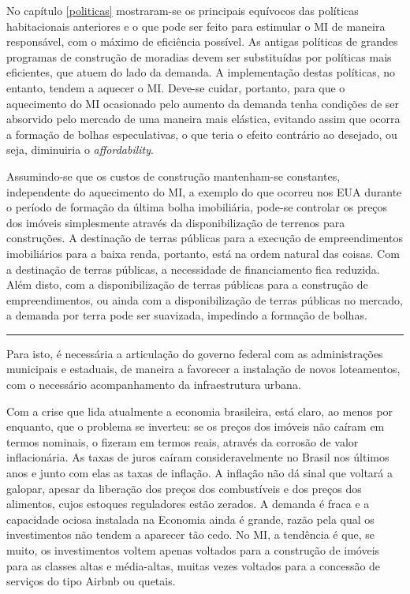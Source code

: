 \documentclass[
	12pt,				%
	oneside,			%
	a4paper,			%
	chapter=TITLE,		%
	section=TITLE,		%
	english,			%
	brazil				%
	]{abntex2}
\begin{document}
\begin{refsection}
No capítulo \ref{politicas} mostraram-se os principais equívocos das políticas
habitacionais anteriores e o que pode ser feito para estimular o \gls{MI} de
maneira responsável, com o máximo de eficiência possível. As antigas políticas
de grandes programas de construção de moradias devem ser substituídas por
políticas mais eficientes, que atuem do lado da demanda. A implementação destas
políticas, no entanto, tendem a aquecer o \gls{MI}. Deve-se cuidar, portanto,
para que o aquecimento do \gls{MI} ocasionado pelo aumento da demanda tenha
condições de ser absorvido pelo mercado de uma maneira mais elástica, evitando
assim que ocorra a formação de bolhas especulativas, o que teria o efeito
contrário ao desejado, ou seja, diminuiria o \emph{affordability}.

Assumindo-se que os custos de construção mantenham-se constantes, independente
do aquecimento do \gls{MI}, a exemplo do que ocorreu nos EUA durante o período
de formação da última bolha imobiliária, pode-se controlar os preços dos imóveis
simplesmente através da disponibilização de terrenos para construções. A
destinação de terras públicas para a execução de empreendimentos imobiliários
para a baixa renda, portanto, está na ordem natural das coisas. Com a destinação
de terras públicas, a necessidade de financiamento fica reduzida. Além disto,
com a disponibilização de terras públicas para a construção de empreendimentos,
ou ainda com a disponibilização de terras públicas no mercado, a demanda por
terra pode ser suavizada, impedindo a formação de bolhas.
\begin{center}\rule{0.5\linewidth}{0.5pt}\end{center}

Para isto, é necessária a articulação do governo federal com as administrações
municipais e estaduais, de maneira a favorecer a instalação de novos
loteamentos, com o necessário acompanhamento da infraestrutura urbana.

Com a crise que lida atualmente a economia brasileira, está claro, ao menos
por enquanto, que o problema se inverteu: se os preços dos imóveis não caíram
em termos nominais, o fizeram em termos reais, através da corrosão de valor
inflacionária. As taxas de juros caíram consideravelmente no Brasil nos últimos
anos e junto com elas as taxas de inflação. A inflação não dá sinal que voltará
a galopar, apesar da liberação dos preços dos combustíveis e dos preços dos
alimentos, cujos estoques reguladores estão zerados. A demanda é fraca e a
capacidade ociosa instalada na Economia ainda é grande, razão pela qual os
investimentos não tendem a aparecer tão cedo. No \gls{MI}, a tendência é que, se
muito, os investimentos voltem apenas voltados para a construção de imóveis para
as classes altas e média-altas, muitas vezes voltados para a concessão de
serviços do tipo Airbnb ou quetais.


\end{refsection}
\end{document}
